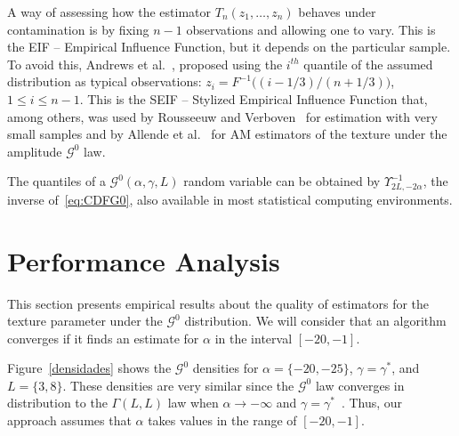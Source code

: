 \documentclass[twocolumn]{svjour3}
\begin{document}
A way of assessing how the estimator $T_n(z_1,\dots,z_n)$ behaves under contamination is by fixing $n-1$ observations and allowing one to vary.
This is the EIF -- Empirical Influence Function, but it depends on the particular sample.
To avoid this, Andrews et al.~\cite{Andrews1972}, proposed using the $i^{th}$ quantile of the assumed distribution as typical observations: $z_i=F^{-1}\big((i-1/3)/(n+1/3) \big)$, $1\leq i\leq n-1$.
This is the SEIF -- Stylized Empirical Influence Function that, among others, was used by Rousseeuw and Verboven~\cite{RousseeuwCSDA} for estimation with very small samples and by Allende et al.~\cite{AllendeFreryetal:JSCS:05} for AM estimators of the texture under the amplitude $\mathcal G^0$ law.

The quantiles of a $\mathcal G^0(\alpha,\gamma,L)$ random variable can be obtained by $\Upsilon^{-1}_{2L,-2\alpha}$, the inverse of~\eqref{eq:CDFG0}, also available in most statistical computing environments.


\section{Performance Analysis}\label{simulation}

This section presents empirical results about the quality of estimators for the texture parameter under the $\mathcal G^0$ distribution. 
We will consider that an algorithm converges if it finds an estimate for $\alpha$ in the interval $[-20,-1]$.    

Figure~\ref{densidades} shows the $\mathcal{G}^0$ densities for  $\alpha=\{-20,-25\}$, $\gamma=\gamma^*$, and $L=\{3,8\}$. 
These densities are very similar since the $\mathcal{G}^0$ law converges in distribution to the $\Gamma(L,L)$ law when $\alpha \to -\infty$ and $\gamma=\gamma^*$~\cite{Frery99}. 
Thus, our approach assumes that $\alpha$ takes values in the range of $[-20,-1]$. 
\end{document}
